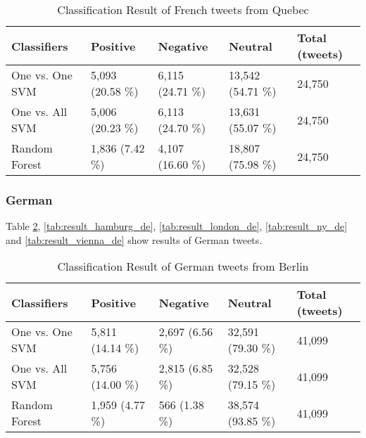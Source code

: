 \begin{table}[ht]
	\caption{Classification Result of French tweets from Quebec}
	\begin{tabular}{|l|p{1.8cm}|p{1.8cm}|p{1.8cm}|p{1.8cm}|} \hline
	Classifiers & Positive & Negative & Neutral & Total (tweets)\\ \hline
	
	One vs. One SVM & 5,093 (20.58 \%)& 6,115 (24.71 \%)& 13,542 (54.71 \%)& 24,750 \\ \hline
	One vs. All SVM & 5,006 (20.23 \%)& 6,113 (24.70 \%)& 13,631 (55.07 \%)& 24,750 \\ \hline
	Random Forest   & 1,836 \newline(7.42 \%)& 4,107 (16.60 \%)& 18,807 (75.98 \%)& 24,750 \\ \hline
	\end{tabular}
	\label{tab:result_quebec_fr}
\end{table}

\begin{comment}
London
N.Y or San Francisco

\end{comment}

\clearpage
\subsubsection{German}
Table \ref{tab:result_berlin_de}, \ref{tab:result_hamburg_de}, \ref{tab:result_london_de}, \ref{tab:result_ny_de} and \ref{tab:result_vienna_de} show results of German tweets.
\begin{table}[ht]
	\caption{Classification Result of German tweets from Berlin}
	\begin{tabular}{|l|p{1.8cm}|p{1.8cm}|p{1.8cm}|p{1.8cm}|} \hline
	Classifiers & Positive & Negative & Neutral & Total (tweets)\\ \hline
One vs. One SVM & 5,811 (14.14 \%) & 2,697 \newline(6.56 \%)  & 32,591 (79.30 \%)& 41,099\\ \hline
One vs. All SVM & 5,756 (14.00 \%) & 2,815 \newline(6.85 \%) & 32,528 (79.15 \%) & 41,099 \\ \hline
Random Forest   & 1,959 \newline(4.77 \%) & 566 \newline(1.38 \%) & 38,574 (93.85 \%) & 41,099 \\ \hline
	\end{tabular}
	\label{tab:result_berlin_de}
\end{table}


